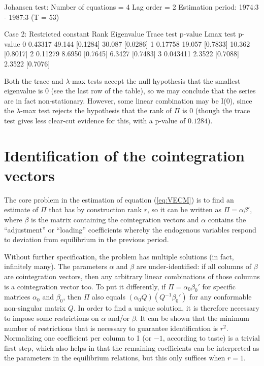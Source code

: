 \begin{center}
\begin{code}
Johansen test:
Number of equations = 4
Lag order = 2
Estimation period: 1974:3 - 1987:3 (T = 53)

Case 2: Restricted constant
Rank Eigenvalue Trace test p-value   Lmax test  p-value
   0    0.43317     49.144 [0.1284]     30.087 [0.0286]
   1    0.17758     19.057 [0.7833]     10.362 [0.8017]
   2    0.11279     8.6950 [0.7645]     6.3427 [0.7483]
   3   0.043411     2.3522 [0.7088]     2.3522 [0.7076]
\end{code}
\end{center}

Both the trace and $\lambda$-max tests accept the null hypothesis that
the smallest eigenvalue is 0 (see the last row of the table), so we
may conclude that the series are in fact non-stationary.  However,
some linear combination may be I(0), since the $\lambda$-max test
rejects the hypothesis that the rank of $\Pi$ is 0 (though the trace
test gives less clear-cut evidence for this, with a p-value of
$0.1284$).

\section{Identification of the cointegration vectors}
\label{sec:johansen-ident}

The core problem in the estimation of equation (\ref{eq:VECM}) is to
find an estimate of $\Pi$ that has by construction rank $r$, so it can
be written as $\Pi = \alpha \beta'$, where $\beta$ is the matrix
containing the cointegration vectors and $\alpha$ contains the
``adjustment'' or ``loading'' coefficients whereby the endogenous
variables respond to deviation from equilibrium in the previous period.

Without further specification, the problem has multiple solutions (in
fact, infinitely many). The parameters $\alpha$ and $\beta$ are
under-identified: if all columns of $\beta$ are cointegration vectors,
then any arbitrary linear combinations of those columns is a
cointegration vector too.  To put it differently, if $\Pi = \alpha_0
\beta_0'$ for specific matrices $\alpha_0$ and $\beta_0$, then $\Pi$
also equals $(\alpha_0 Q)(Q^{-1} \beta_0')$ for any conformable
non-singular matrix $Q$.  In order to find a unique solution, it
is therefore necessary to impose some restrictions on $\alpha$ and/or
$\beta$. It can be shown that the minimum number of restrictions that
is necessary to guarantee identification is $r^2$.  Normalizing one
coefficient per column to 1 (or $-1$, according to taste) is a trivial
first step, which also helps in that the remaining coefficients can be
interpreted as the parameters in the equilibrium relations, but this
only suffices when $r=1$.

